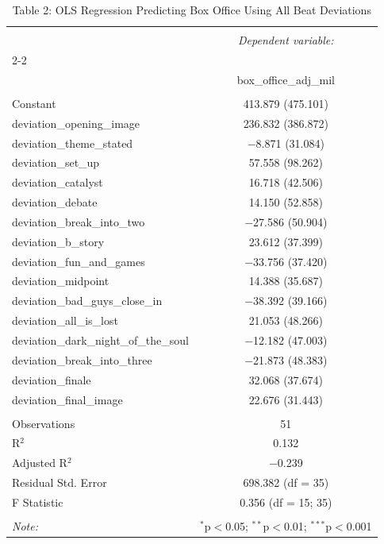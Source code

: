 
\begin{table}[!htbp] \centering 
  \caption{Table 2: OLS Regression Predicting Box Office Using All Beat Deviations} 
  \label{tab:model2_ols_allbeats} 
\begin{tabular}{@{\extracolsep{5pt}}lc} 
\\[-1.8ex]\hline 
\hline \\[-1.8ex] 
 & \multicolumn{1}{c}{\textit{Dependent variable:}} \\ 
\cline{2-2} 
\\[-1.8ex] & box\_office\_adj\_mil \\ 
\hline \\[-1.8ex] 
 Constant & 413.879 (475.101) \\ 
  deviation\_opening\_image & 236.832 (386.872) \\ 
  deviation\_theme\_stated & $-$8.871 (31.084) \\ 
  deviation\_set\_up & 57.558 (98.262) \\ 
  deviation\_catalyst & 16.718 (42.506) \\ 
  deviation\_debate & 14.150 (52.858) \\ 
  deviation\_break\_into\_two & $-$27.586 (50.904) \\ 
  deviation\_b\_story & 23.612 (37.399) \\ 
  deviation\_fun\_and\_games & $-$33.756 (37.420) \\ 
  deviation\_midpoint & 14.388 (35.687) \\ 
  deviation\_bad\_guys\_close\_in & $-$38.392 (39.166) \\ 
  deviation\_all\_is\_lost & 21.053 (48.266) \\ 
  deviation\_dark\_night\_of\_the\_soul & $-$12.182 (47.003) \\ 
  deviation\_break\_into\_three & $-$21.873 (48.383) \\ 
  deviation\_finale & 32.068 (37.674) \\ 
  deviation\_final\_image & 22.676 (31.443) \\ 
 \hline \\[-1.8ex] 
Observations & 51 \\ 
R$^{2}$ & 0.132 \\ 
Adjusted R$^{2}$ & $-$0.239 \\ 
Residual Std. Error & 698.382 (df = 35) \\ 
F Statistic & 0.356 (df = 15; 35) \\ 
\hline 
\hline \\[-1.8ex] 
\textit{Note:}  & \multicolumn{1}{r}{$^{*}$p$<$0.05; $^{**}$p$<$0.01; $^{***}$p$<$0.001} \\ 
\end{tabular} 
\end{table} 
